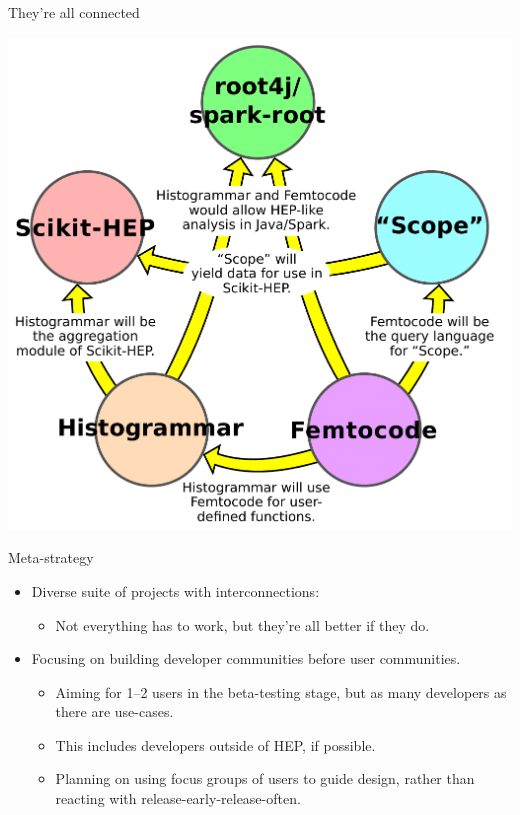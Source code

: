 \documentclass{beamer}
\begin{document}
\begin{frame}{They're all connected}
\begin{center}
\includegraphics[width=0.8\linewidth]{relationships.pdf}
\end{center}
\end{frame}

\begin{frame}{Meta-strategy}
\vspace{0.25 cm}
\begin{itemize}
\item Diverse suite of projects with interconnections:
\begin{itemize}
\item Not everything has to work, but they're all better if they do.
\end{itemize}

\item Focusing on building developer communities before user communities.
\begin{itemize}
\item Aiming for 1--2 users in the beta-testing stage, but as many developers as there are use-cases.
\item This includes developers outside of HEP, if possible.
\item Planning on using focus groups of users to guide design, rather than reacting with release-early-release-often.
\end{itemize}
\end{itemize}
\end{frame}
\end{document}
